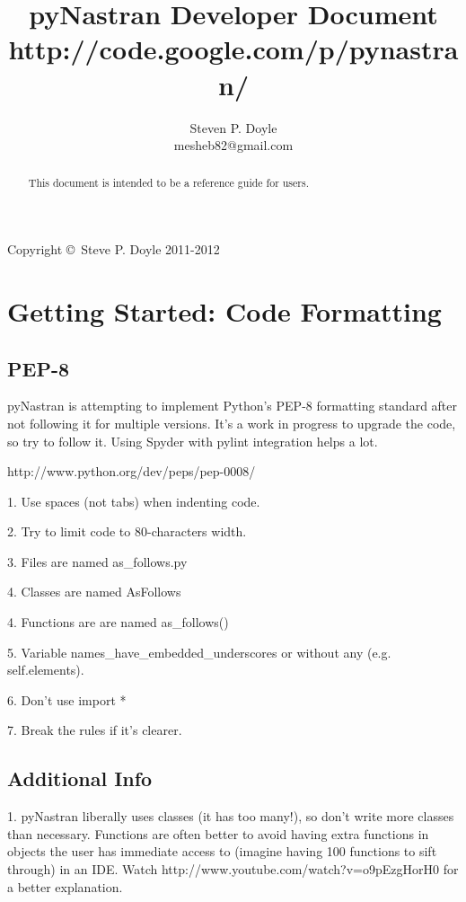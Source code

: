 
\title{pyNastran Developer Document \\
\small http://code.google.com/p/pynastran/ }
\author{Steven P. Doyle\\
{\small mesheb82@gmail.com}
}

\maketitle

\begin{abstract}
This document is intended to be a reference guide for users.
\end{abstract}

Copyright \copyright\ Steve P. Doyle 2011-2012
\newpage

\tableofcontents
\newpage

\section{Getting Started: Code Formatting}
 \subsection{PEP-8}
     pyNastran is attempting to implement Python's PEP-8 formatting standard after not following it for multiple versions.  It's a work in progress to upgrade the code, so try to follow it.
     Using Spyder with pylint integration helps a lot.
     
     http://www.python.org/dev/peps/pep-0008/

     1.  Use spaces (not tabs) when indenting code.

     2.  Try to limit code to 80-characters width.

     3.  Files are named as\_follows.py

     4.  Classes are named AsFollows

     4.  Functions are are named as\_follows()

     5.  Variable names\_have\_embedded\_underscores or without any (e.g. self.elements).

     6.  Don't use import *

     7.  Break the rules if it's clearer.

 \subsection{Additional Info}
     1.  pyNastran liberally uses classes (it has too many!), so don't write more classes than necessary.  Functions are often better to avoid having extra functions in objects the user has immediate access to (imagine having 100 functions to sift through) in an IDE.  Watch http://www.youtube.com/watch?v=o9pEzgHorH0 for a better explanation.
     
